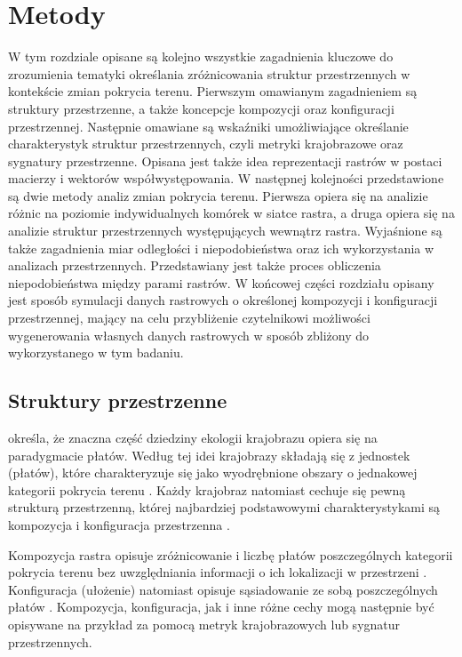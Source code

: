 \documentclass{amuthesis}
\begin{document}

\hypertarget{sec-metody}{%
\chapter{Metody}\label{sec-metody}}

W tym rozdziale opisane są kolejno wszystkie zagadnienia kluczowe do
zrozumienia tematyki określania zróżnicowania struktur przestrzennych w
kontekście zmian pokrycia terenu. Pierwszym omawianym zagadnieniem są
struktury przestrzenne, a także koncepcje kompozycji oraz konfiguracji
przestrzennej. Następnie omawiane są wskaźniki umożliwiające określanie
charakterystyk struktur przestrzennych, czyli metryki krajobrazowe oraz
sygnatury przestrzenne. Opisana jest także idea reprezentacji rastrów w
postaci macierzy i wektorów współwystępowania. W następnej kolejności
przedstawione są dwie metody analiz zmian pokrycia terenu. Pierwsza
opiera się na analizie różnic na poziomie indywidualnych komórek w
siatce rastra, a druga opiera się na analizie struktur przestrzennych
występujących wewnątrz rastra. Wyjaśnione są także zagadnienia miar
odległości i niepodobieństwa oraz ich wykorzystania w analizach
przestrzennych. Przedstawiany jest także proces obliczenia
niepodobieństwa między parami rastrów. W końcowej części rozdziału
opisany jest sposób symulacji danych rastrowych o określonej kompozycji
i konfiguracji przestrzennej, mający na celu przybliżenie czytelnikowi
możliwości wygenerowania własnych danych rastrowych w sposób zbliżony do
wykorzystanego w tym badaniu.

\hypertarget{struktury-przestrzenne}{%
\section{Struktury przestrzenne}\label{struktury-przestrzenne}}

\textcite{mcgarigal2009} określa, że znaczna część dziedziny ekologii
krajobrazu opiera się na paradygmacie płatów. Według tej idei krajobrazy
składają się z jednostek (płatów), które charakteryzuje się jako
wyodrębnione obszary o jednakowej kategorii pokrycia terenu
\autocite{forman1995land,solon2002}. Każdy krajobraz natomiast cechuje
się pewną strukturą przestrzenną, której najbardziej podstawowymi
charakterystykami są kompozycja i konfiguracja przestrzenna
\autocite{Gustafson1998}.

Kompozycja rastra opisuje zróżnicowanie i liczbę płatów poszczególnych
kategorii pokrycia terenu bez uwzględniania informacji o ich lokalizacji
w przestrzeni \autocite{Gustafson1998,solon2002,kozak2014}. Konfiguracja
(ułożenie) natomiast opisuje sąsiadowanie ze sobą poszczególnych płatów
\autocite{Gustafson1998,solon2002,kozak2014}. Kompozycja, konfiguracja,
jak i inne różne cechy mogą następnie być opisywane na przykład za
pomocą metryk krajobrazowych lub sygnatur przestrzennych.
\end{document}
